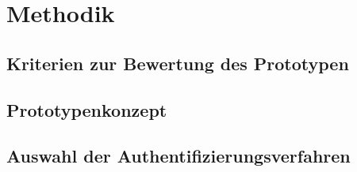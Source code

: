 \chapter{Methodik}
\section{Kriterien zur Bewertung des Prototypen}
\section{Prototypenkonzept}
\section{Auswahl der Authentifizierungsverfahren}
